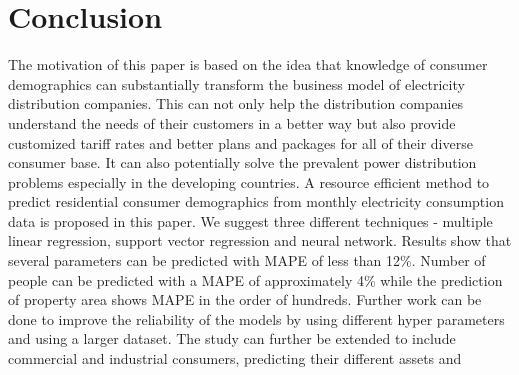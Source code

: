 \documentclass[conference]{IEEEtran}
\begin{document}
\section{Conclusion}
The motivation of this paper is based on the idea that knowledge of consumer demographics can substantially transform the business model of electricity distribution companies. This can not only help the distribution companies understand the needs of their customers in a better way but also provide customized tariff rates and better plans and packages for all of their diverse consumer base. It can also potentially solve the prevalent power distribution problems especially in the developing countries. A resource efficient method to predict residential consumer demographics from monthly electricity consumption data is proposed in this paper. We suggest three different techniques - multiple linear regression, support vector regression and neural network. Results show that several parameters can be predicted with MAPE of less than 12\%. Number of people can be predicted with a MAPE of approximately 4\% while the prediction of property area shows MAPE in the order of hundreds. Further work can be done to improve the reliability of the models by using different hyper parameters and using a larger dataset. The study can further be extended to include commercial and industrial consumers, predicting their different assets and







\vspace{12pt}
\end{document}
